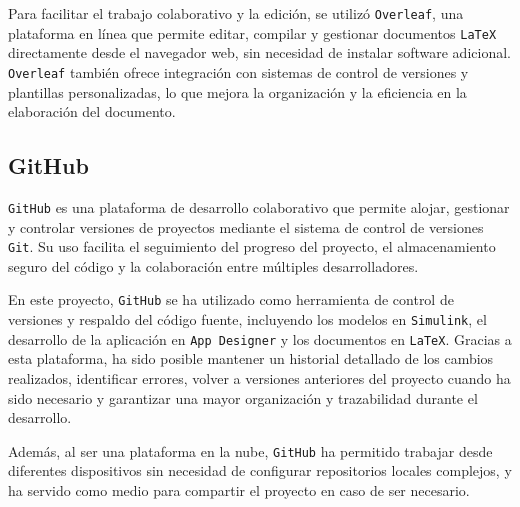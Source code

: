 Para facilitar el trabajo colaborativo y la edición, se utilizó \texttt{Overleaf}, una plataforma en línea que permite editar, compilar y gestionar documentos \texttt{LaTeX} directamente desde el navegador web, sin necesidad de instalar software adicional. \texttt{Overleaf} también ofrece integración con sistemas de control de versiones y plantillas personalizadas, lo que mejora la organización y la eficiencia en la elaboración del documento.

\subsection{GitHub}
\texttt{GitHub} \cite{githubdocs} es una plataforma de desarrollo colaborativo que permite alojar, gestionar y controlar versiones de proyectos mediante el sistema de control de versiones \texttt{Git}. Su uso facilita el seguimiento del progreso del proyecto, el almacenamiento seguro del código y la colaboración entre múltiples desarrolladores.

En este proyecto, \texttt{GitHub} se ha utilizado como herramienta de control de versiones y respaldo del código fuente, incluyendo los modelos en \texttt{Simulink}, el desarrollo de la aplicación en \texttt{App Designer} y los documentos en \texttt{LaTeX}. Gracias a esta plataforma, ha sido posible mantener un historial detallado de los cambios realizados, identificar errores, volver a versiones anteriores del proyecto cuando ha sido necesario y garantizar una mayor organización y trazabilidad durante el desarrollo.

Además, al ser una plataforma en la nube, \texttt{GitHub} ha permitido trabajar desde diferentes dispositivos sin necesidad de configurar repositorios locales complejos, y ha servido como medio para compartir el proyecto en caso de ser necesario.

